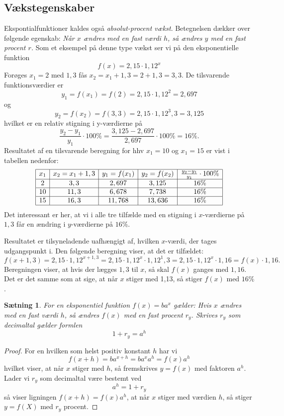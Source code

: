 \documentclass[12pt,oneside,a4paper]{article}
\newtheorem{thm}{Sætning}[section]
\begin{document}
\subsection{Vækstegenskaber}
Ekspontialfunktioner kaldes også {\em absolut-procent vækst}. Betegnelsen
dækker over følgende egenskab: {\em Når $x$ ændres med en fast værdi $h$, så
ændres $y$ med en fast procent $r$.} Som et eksempel på denne type vækst ser vi
på den eksponentielle funktion
$$
f(x) = 2,15 \cdot 1,12^x
$$
Forøges $x_1 = 2$ med $1,3$ fås $x_2 = x_1 + 1,3 = 2 + 1,3 = 3,3$. De tilsvarende 
funktionsværdier er 
$$
y_1 = f(x_1) = f(2) = 2,15 \cdot 1,12^2 = 2,697
$$
og
$$
y_2 = f(x_2) = f(3,3) = 2,15 \cdot 1,12^3,3 = 3,125
$$
hvilket er en relativ stigning i y-værdierne på 
$$
\frac{y_2-y_1}{y_1} \cdot 100\% = \frac{3,125 - 2,697}{2,697} \cdot 100 \% = 16 \%.
$$
Resultatet af en tilsvarende beregning for hhv $x_1 = 10$ og $x_1 = 15$ er vist
i tabellen nedenfor:
$$
\begin{array}{|c|c|c|c|c|}
    \hline 
    x_1 & x_2 = x_1 + 1,3 & y_1 = f(x_1) & y_2 = f(x_2) & \frac{y_2-y_1}{y_1} \cdot 100 \% \\
    \hline 
    2 & 3,3 & 2,697 & 3,125 & 16\% \\
    \hline 
    10 & 11,3 & 6,678 & 7,738 & 16\% \\
    \hline 
    15 & 16,3 & 11,768 & 13,636 & 16\% \\
    \hline
\end{array}
$$
Det interessant er her, at vi i alle tre tilfælde med en stigning i
$x$-værdierne på $1,3$ får en ændring i $y$-værdierne på $16\%$.

Resultatet er tilsyneladende uafhængigt af, hvilken $x$-værdi, der tages
udgangspunkt i. Den følgende beregning viser, at det er tilfældet:
$$
f(x + 1,3) = 2,15 \cdot 1,12^{x+1,3} = 2,15 \cdot 1,12^x \cdot 1,12^1,3 = 2,15 \cdot 1,12^x \cdot 1,16 = f(x) \cdot 1,16.
$$
Beregningen viser, at hvis der lægges $1,3$ til $x$, så skal $f(x)$ ganges med
$1,16$. Det er det samme som at sige, at når $x$ stiger med 1,13, så stiger
$f(x)$ med $16\%$.

\begin{thm}
    For en eksponentiel funktion $f(x) = ba^x$ gælder:
    Hvis $x$ ændres med en fast værdi $h$, så ændres $f(x)$ med en fast procent
    $r_y$. Skrives $r_y$ som decimaltal gælder formlen
    $$
    1+r_y = a^h
    $$
\end{thm}
\begin{proof}
    For en hvilken som helst positiv konstant $h$ har vi
    $$
    f(x+h) = ba^{x+h} = ba^x a^h = f(x) a^h
    $$
    hvilket viser, at når $x$ stiger med $h$, så fremskrives $y=f(x)$ med
    faktoren $a^h$. Lader vi $r_y$ som decimaltal være bestemt ved
    $$
    a^h = 1+r_y
    $$
    så viser ligningen $f(x+h) = f(x) a^h$, at når $x$ stiger med værdien $h$,
    så stiger $y=f(X)$ med $r_y$ procent.
\end{proof}
\end{document}
